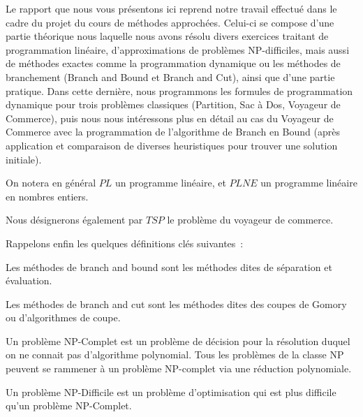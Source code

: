 Le rapport que nous vous présentons ici reprend notre travail effectué
dans le cadre du projet du cours de méthodes approchées. Celui-ci se
compose d'une partie théorique nous laquelle nous avons résolu divers
exercices traitant de programmation linéaire, d'approximations de
problèmes NP-difficiles, mais aussi de méthodes exactes comme la
programmation dynamique ou les méthodes de branchement (Branch and
Bound et Branch and Cut), ainsi que d'une partie pratique. Dans cette
dernière, nous programmons les formules de programmation dynamique
pour trois problèmes classiques (Partition, Sac à Dos, Voyageur de
Commerce), puis nous nous intéressons plus en détail au cas du
Voyageur de Commerce avec la programmation de l'algorithme de Branch
en Bound (après application et comparaison de diverses heuristiques
pour trouver une solution initiale).

On notera en général $PL$ un programme linéaire, et $PLNE$ un
programme linéaire en nombres entiers. 

Nous désignerons également par $TSP$ le problème du voyageur de
commerce.

Rappelons enfin les quelques définitions clés suivantes~:
\begin{mydef}
Les méthodes de branch and bound sont les méthodes dites de séparation
et évaluation.
\end{mydef}

\begin{mydef}
Les méthodes de branch and cut sont les méthodes dites des coupes de
Gomory ou d'algorithmes de coupe.
\end{mydef}

\begin{mydef}
Un problème NP-Complet est un problème de décision pour la résolution duquel on ne
connait pas d'algorithme polynomial. Tous les problèmes de la classe
NP peuvent se rammener à un problème NP-complet via une réduction polynomiale.
\end{mydef}

\begin{mydef}
Un problème NP-Difficile est un problème d'optimisation qui est plus
difficile qu'un problème NP-Complet.
\end{mydef}